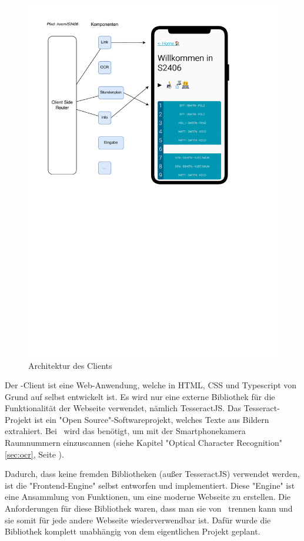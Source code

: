 
\begin{figure}[H]
    \centering
    \includegraphics[width=120mm]{media/Intro/client_arch.svg.pdf}
    \caption{Architektur des Clients}
\end{figure}

Der \ZELIA-Client ist eine Web-Anwendung, welche in HTML, CSS und Typescript von Grund auf selbst entwickelt ist. Es wird nur eine externe Bibliothek für die Funktionalität der Webseite verwendet, nämlich TesseractJS. Das Tesseract-Projekt ist ein "Open Source"-Softwareprojekt, welches Texte aus Bildern extrahiert. Bei \ZELIA\ wird das benötigt, um mit der Smartphonekamera Raumnummern einzuscannen (siehe Kapitel "Optical Character Recognition" \ref{sec:ocr}, Seite \pageref{sec:ocr}).

Dadurch, dass keine fremden Bibliotheken (außer TesseractJS) verwendet werden, ist die "Frontend-Engine" selbst entworfen und implementiert. Diese "Engine" ist eine Ansammlung von Funktionen, um eine moderne Webseite zu erstellen. Die Anforderungen für diese Bibliothek waren, dass man sie von \ZELIA\ trennen kann und sie somit für jede andere Webseite wiederverwendbar ist. Dafür wurde die Bibliothek komplett unabhängig von dem eigentlichen Projekt geplant. 


